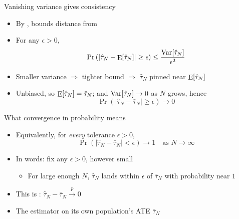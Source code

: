 \documentclass[table, xcolor = {dvipsnames}, 9pt]{beamer}
\theoremstyle{plain}
\newcommand{\mh}[1]{{\color{magenta}{#1}}}
\DeclareMathOperator{\E}{\rm{E}}
\DeclareMathOperator{\Var}{\rm{Var}}
\begin{document}
\begin{frame}[t]{Vanishing variance gives consistency}
\vfill
\begin{itemize} \vfill
\item By \mh{Chebyshev Inequality}, \mh{variance} bounds distance from \mh{expected value} \vfill
\item[] For any $\epsilon > 0$,
\begin{equation*}
\Pr\left(\left\lvert \hat{\tau}_N - \E[\hat{\tau}_N] \right\rvert \geq \epsilon\right) \leq \frac{\Var[\hat{\tau}_N]}{\epsilon^2}
\end{equation*} \vfill
\item[] Smaller variance $\Rightarrow$ tighter bound $\Rightarrow$ $\hat{\tau}_N$ pinned near $\E[\hat{\tau}_N]$ \vfill
\item Unbiased, so $\E[\hat{\tau}_N] = \bar{\tau}_N$; and $\Var[\hat{\tau}_N] \to 0$ as $N$ grows, hence \vfill
\begin{equation*}
\Pr\left(\left\lvert \hat{\tau}_N - \bar{\tau}_N \right\rvert \geq \epsilon\right) \longrightarrow 0
\end{equation*} \vfill
\end{itemize} \vfill
\end{frame}
\begin{frame}[t]{What convergence in probability means}
\vfill
\begin{itemize} \vfill
\item Equivalently, for \emph{every} tolerance $\epsilon > 0$, \vfill
\begin{equation*}
\Pr\left(\left\lvert \hat{\tau}_N - \bar{\tau}_N \right\rvert < \epsilon\right) \to 1 \quad \text{as } N \to \infty
\end{equation*} \vfill
\item In words: fix any $\epsilon > 0$, however small \vfill
\begin{itemize} \vfill
\item For large enough $N$, $\hat{\tau}_N$ lands within $\epsilon$ of $\bar{\tau}_N$ with probability near $1$ \vfill
\end{itemize} \vfill
\item This is \mh{convergence in probability}: $\hat{\tau}_N - \bar{\tau}_N \overset{p}{\to} 0$ \vfill
\item The estimator \mh{concentrates} on its own population's ATE $\bar{\tau}_N$ \vfill
\end{itemize} \vfill
\end{frame}
\end{document}
